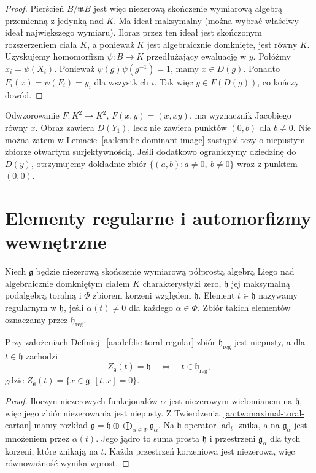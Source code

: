 \begin{proof}
Pierścień $B/\mathfrak mB$ jest więc niezerową skończenie wymiarową algebrą przemienną z jedynką nad $K$. Ma ideał maksymalny (można wybrać właściwy ideał największego wymiaru). Iloraz przez ten ideał jest skończonym rozszerzeniem ciała $K$, a ponieważ $K$ jest algebraicznie domknięte, jest równy $K$. Uzyskujemy homomorfizm $\psi:B\to K$ przedłużający ewaluację w $y$. Połóżmy $x_i=\psi(X_i)$. Ponieważ $\psi(g)\psi(g^{-1})=1$, mamy $x\in D(g)$. Ponadto $F_i(x)=\psi(F_i)=y_i$ dla wszystkich $i$. Tak więc $y\in F(D(g))$, co kończy dowód.
\end{proof}

\begin{przyklad}
\label{aa:prz:lie-dominant-image}
Odwzorowanie $F:K^2\to K^2$, $F(x,y)=(x,xy)$, ma wyznacznik Jacobiego równy $x$. Obraz zawiera $D(Y_1)$, lecz nie zawiera punktów $(0,b)$ dla $b\ne0$. Nie można zatem w Lemacie~\ref{aa:lem:lie-dominant-image} zastąpić tezy o niepustym zbiorze otwartym surjektywnością. Jeśli dodatkowo ograniczymy dziedzinę do $D(y)$, otrzymujemy dokładnie zbiór $\{(a,b):a\ne0,\ b\ne0\}$ wraz z punktem $(0,0)$.
\end{przyklad}

\section{Elementy regularne i automorfizmy wewnętrzne}

\begin{definicja}
\label{aa:def:lie-toral-regular}
Niech $\mathfrak g$ będzie niezerową skończenie wymiarową półprostą algebrą Liego nad algebraicznie domkniętym ciałem $K$ charakterystyki zero, $\mathfrak h$ jej maksymalną podalgebrą toralną i $\Phi$ zbiorem korzeni względem $\mathfrak h$. Element $t\in\mathfrak h$ nazywamy regularnym w $\mathfrak h$, jeśli $\alpha(t)\ne0$ dla każdego $\alpha\in\Phi$. Zbiór takich elementów oznaczamy przez $\mathfrak h_{\mathrm{reg}}$.
\end{definicja}

\begin{lemat}
\label{aa:lem:lie-regular-centralizer}
Przy założeniach Definicji~\ref{aa:def:lie-toral-regular} zbiór $\mathfrak h_{\mathrm{reg}}$ jest niepusty, a dla $t\in\mathfrak h$ zachodzi
\[
 Z_{\mathfrak g}(t)=\mathfrak h
 \quad\Longleftrightarrow\quad
 t\in\mathfrak h_{\mathrm{reg}},
\]
gdzie $Z_{\mathfrak g}(t)=\{x\in\mathfrak g:[t,x]=0\}$.
\end{lemat}
\begin{proof}
Iloczyn niezerowych funkcjonałów $\alpha$ jest niezerowym wielomianem na $\mathfrak h$, więc jego zbiór niezerowania jest niepusty. Z Twierdzenia~\ref{aa:tw:maximal-toral-cartan} mamy rozkład $\mathfrak g=\mathfrak h\oplus\bigoplus_{\alpha\in\Phi}\mathfrak g_\alpha$. Na $\mathfrak h$ operator $\operatorname{ad}_t$ znika, a na $\mathfrak g_\alpha$ jest mnożeniem przez $\alpha(t)$. Jego jądro to suma prosta $\mathfrak h$ i przestrzeni $\mathfrak g_\alpha$ dla tych korzeni, które znikają na $t$. Każda przestrzeń korzeniowa jest niezerowa, więc równoważność wynika wprost.
\end{proof}

